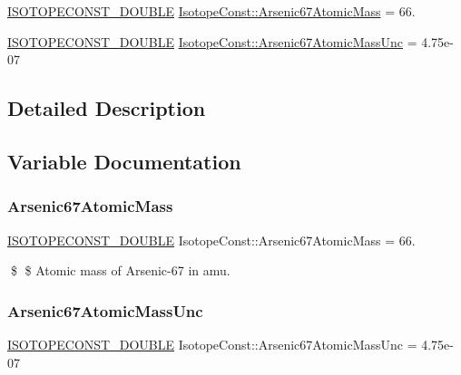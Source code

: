 \begin{DoxyCompactItemize}
\item 
\mbox{\hyperlink{group___isotope_const-_macros_ga8f45a7272ce02c0b4c65c44636ed719a}{I\+S\+O\+T\+O\+P\+E\+C\+O\+N\+S\+T\+\_\+\+D\+O\+U\+B\+LE}} \mbox{\hyperlink{group___isotope_const-_arsenic-_as67_ga54d271c73f77e8bd8e28bd3bdb041de1}{Isotope\+Const\+::\+Arsenic67\+Atomic\+Mass}} = 66.
\item 
\mbox{\hyperlink{group___isotope_const-_macros_ga8f45a7272ce02c0b4c65c44636ed719a}{I\+S\+O\+T\+O\+P\+E\+C\+O\+N\+S\+T\+\_\+\+D\+O\+U\+B\+LE}} \mbox{\hyperlink{group___isotope_const-_arsenic-_as67_ga1080a9fc9797d88418473c76bb934882}{Isotope\+Const\+::\+Arsenic67\+Atomic\+Mass\+Unc}} = 4.\+75e-\/07
\end{DoxyCompactItemize}


\subsection{Detailed Description}


\subsection{Variable Documentation}
\mbox{\label{group___isotope_const-_arsenic-_as67_ga54d271c73f77e8bd8e28bd3bdb041de1}} 
\subsubsection{\texorpdfstring{Arsenic67\+Atomic\+Mass}{Arsenic67AtomicMass}}
{\footnotesize\ttfamily \mbox{\hyperlink{group___isotope_const-_macros_ga8f45a7272ce02c0b4c65c44636ed719a}{I\+S\+O\+T\+O\+P\+E\+C\+O\+N\+S\+T\+\_\+\+D\+O\+U\+B\+LE}} Isotope\+Const\+::\+Arsenic67\+Atomic\+Mass = 66.}

\$ \$ Atomic mass of Arsenic-\/67 in amu. \mbox{\label{group___isotope_const-_arsenic-_as67_ga1080a9fc9797d88418473c76bb934882}} 
\subsubsection{\texorpdfstring{Arsenic67\+Atomic\+Mass\+Unc}{Arsenic67AtomicMassUnc}}
{\footnotesize\ttfamily \mbox{\hyperlink{group___isotope_const-_macros_ga8f45a7272ce02c0b4c65c44636ed719a}{I\+S\+O\+T\+O\+P\+E\+C\+O\+N\+S\+T\+\_\+\+D\+O\+U\+B\+LE}} Isotope\+Const\+::\+Arsenic67\+Atomic\+Mass\+Unc = 4.\+75e-\/07}

